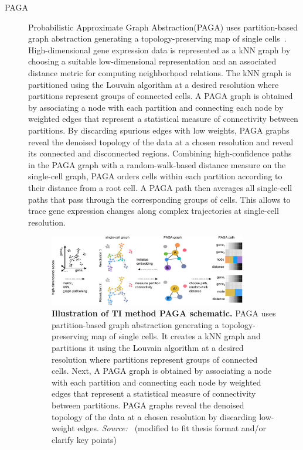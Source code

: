 \begin{description}
  \item[PAGA]
  Probabilistic Approximate Graph Abstraction(PAGA) uses partition-based graph abstraction generating a topology-preserving map of single cells~\citep{wolf2019paga}. High-dimensional gene expression data is represented as a kNN graph by choosing a suitable low-dimensional representation and an associated distance metric for computing neighborhood relations. The kNN graph is partitioned using the Louvain algorithm at a desired resolution where partitions represent groups of connected cells. A PAGA graph is obtained by associating a node with each partition and connecting each node by weighted edges that represent a statistical measure of connectivity between partitions. By discarding spurious edges with low weights, PAGA graphs reveal the denoised topology of the data at a chosen resolution and reveal its connected and disconnected regions. Combining high-confidence paths in the PAGA graph with a random-walk-based distance measure on the single-cell graph, PAGA orders cells within each partition according to their distance from a root cell. A PAGA path then averages all single-cell paths that pass through the corresponding groups of cells. This allows to trace gene expression changes along complex trajectories at single-cell resolution.
  \begin{figure}[ht!]
  	\centering
  	\includegraphics[width=0.85\textwidth]{TI_Alg_PAGA/fig}
  	\vspace{0.1cm}
  	\caption[Illustration of TI method PAGA schematic.]{\textbf{Illustration of TI method PAGA schematic.}
  	PAGA uses partition-based graph abstraction generating a topology-preserving map of single cells. It creates a kNN graph and partitions it using the Louvain algorithm at a desired resolution where partitions represent groups of connected cells. Next, A PAGA graph is obtained by associating a node with each partition and connecting each node by weighted edges that represent a statistical measure of connectivity between partitions. PAGA graphs reveal the denoised topology of the data at a chosen resolution by discarding low-weight edges. \emph{Source:~\cite{wolf2019paga}} (modified to fit thesis format and/or clarify key points)
  	}
  	\label{fig:TI_Alg_PAGA}
  \end{figure}


\end{description}
